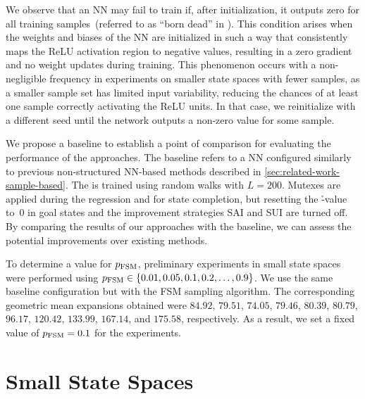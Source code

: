\newpage

We observe that an NN may fail to train if, after initialization, it outputs zero for all training samples~(referred to as ``born dead'' in \citet{lu2020dying}). This condition arises when the weights and biases of the NN are initialized in such a way that consistently maps the ReLU activation region to negative values, resulting in a zero gradient and no weight updates during training. This phenomenon occurs with a non-negligible frequency in experiments on smaller state spaces with fewer samples, as a smaller sample set has limited input variability, reducing the chances of at least one sample correctly activating the ReLU units. In that case, we reinitialize with a different seed until the network outputs a non-zero value for some sample.

We propose a baseline \hnnbase to establish a point of comparison for evaluating the performance of the approaches. The baseline refers to a NN configured similarly to previous non-structured NN-based methods described in \cref{sec:related-work-sample-based}. The \hnnbase is trained using random walks with $L=200$. Mutexes are applied during the regression and for state completion, but resetting the \h-value to~$0$ in goal states and the improvement strategies SAI and SUI are turned off. By comparing the results of our approaches with the baseline, we can assess the potential improvements over existing methods.

To determine a value for $p_{\text{FSM}}$, preliminary experiments in small state spaces were performed using $p_{\text{FSM}}\in\{0.01,0.05,0.1,0.2,\ldots,0.9\}$. We use the same baseline configuration but with the FSM sampling algorithm. The corresponding geometric mean expansions obtained were $84.92$, $79.51$, $74.05$, $79.46$, $80.39$, $80.79$, $96.17$, $120.42$, $133.99$, $167.14$, and $175.58$, respectively. As a result, we set a fixed value of $p_{\text{FSM}} = 0.1$ for the experiments.

\section{Small State Spaces}
\label{sec:small-experiments}

